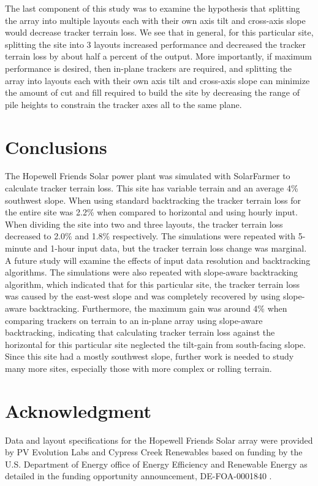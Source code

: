 \documentclass[conference]{IEEEtran}
\begin{document}
The last component of this study was to examine the hypothesis that splitting the array into multiple layouts each with their own axis tilt and cross-axis slope would decrease tracker terrain loss. We see that in general, for this particular site, splitting the site into 3 layouts increased performance and decreased the tracker terrain loss by about half a percent of the output. More importantly, if maximum performance is desired, then in-plane trackers are required, and splitting the array into layouts each with their own axis tilt and cross-axis slope can minimize the amount of cut and fill required to build the site by decreasing the range of pile heights to constrain the tracker axes all to the same plane.

\section{Conclusions}
The Hopewell Friends Solar power plant was simulated with SolarFarmer to calculate tracker terrain loss. This site has variable terrain and an average 4\% southwest slope. When using standard backtracking the tracker terrain loss for the entire site was 2.2\% when compared to horizontal and using hourly input. When dividing the site into two and three layouts, the tracker terrain loss decreased to 2.0\% and 1.8\% respectively. The simulations were repeated with 5-minute and 1-hour input data, but the tracker terrain loss change was marginal. A future study will examine the effects of input data resolution and backtracking algorithms. The simulations were also repeated with slope-aware backtracking algorithm, which indicated that for this particular site, the tracker terrain loss was caused by the east-west slope and was completely recovered by using slope-aware backtracking. Furthermore, the maximum gain was around 4\% when comparing trackers on terrain to an in-plane array using slope-aware backtracking, indicating that calculating tracker terrain loss against the horizontal for this particular site neglected the tilt-gain from south-facing slope.  Since this site had a mostly southwest slope, further work is needed to study many more sites, especially those with more complex or rolling terrain.

\section*{Acknowledgment}

Data and layout specifications for the Hopewell Friends Solar array were provided by PV Evolution Labs and Cypress Creek Renewables based on funding by the U.S. Department of Energy office of Energy Efficiency and Renewable Energy as detailed in the funding opportunity announcement, DE-FOA-0001840 \cite{CypressCreekRenewables2019}.



\end{document}
